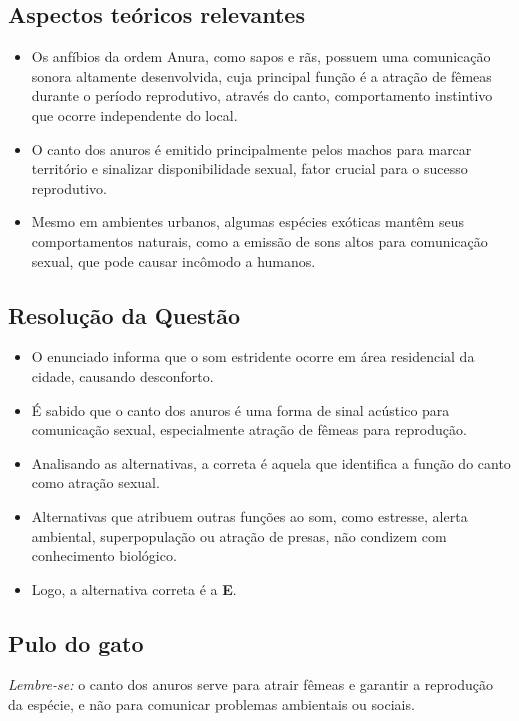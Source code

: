 \documentclass{article}
\begin{document}
\subsection*{Aspectos teóricos relevantes}
\begin{itemize}
  \item Os anfíbios da ordem Anura, como sapos e rãs, possuem uma comunicação sonora altamente desenvolvida, cuja principal função é a atração de fêmeas durante o período reprodutivo, através do canto, comportamento instintivo que ocorre independente do local.
  \item O canto dos anuros é emitido principalmente pelos machos para marcar território e sinalizar disponibilidade sexual, fator crucial para o sucesso reprodutivo.
  \item Mesmo em ambientes urbanos, algumas espécies exóticas mantêm seus comportamentos naturais, como a emissão de sons altos para comunicação sexual, que pode causar incômodo a humanos.
\end{itemize}

\subsection*{Resolução da Questão}
\begin{itemize}
  \item O enunciado informa que o som estridente ocorre em área residencial da cidade, causando desconforto.
  \item É sabido que o canto dos anuros é uma forma de sinal acústico para comunicação sexual, especialmente atração de fêmeas para reprodução.
  \item Analisando as alternativas, a correta é aquela que identifica a função do canto como atração sexual.
  \item Alternativas que atribuem outras funções ao som, como estresse, alerta ambiental, superpopulação ou atração de presas, não condizem com conhecimento biológico.
  \item Logo, a alternativa correta é a \textbf{E}.
\end{itemize}

\subsection*{Pulo do gato}
\emph{Lembre-se:} o canto dos anuros serve para atrair fêmeas e garantir a reprodução da espécie, e não para comunicar problemas ambientais ou sociais.
\end{document}
